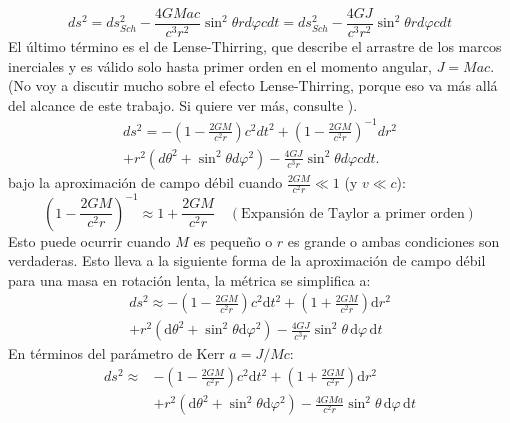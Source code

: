 $$
    d s^2=d s_{S c h}^2-\frac{4 G M a c}{c^3 r^2} \sin ^2 \theta r d \varphi c d t=d s_{S c h}^2-\frac{4 G J}{c^3 r^2} \sin ^2 \theta r d \varphi c d t
$$
El último término es el de Lense-Thirring, que describe el arrastre de los marcos inerciales y es válido solo hasta primer orden en el momento angular, $J = Mac$. (No voy a discutir mucho sobre el efecto Lense-Thirring, porque eso va más allá del alcance de este trabajo. Si quiere ver más, consulte ).
\begin{multline}
    d s^2 = - \left(1-\frac{2 G M}{c^2 r}\right) c^2 d t^2
    + \left(1-\frac{2 G M}{c^2 r}\right)^{-1} d r^2 \\
    + r^2\left(d \theta^2+\sin^2 \theta d \varphi^2\right)
    - \frac{4 G J}{c^3 r} \sin^2 \theta d \varphi c d t.
\end{multline}
bajo la aproximación de campo débil cuando $\frac{2GM}{c^2r} \ll 1$ (y $v \ll c$):
\begin{equation}
    \left(1-\frac{2GM}{c^2r}\right)^{-1} \approx 1 + \frac{2GM}{c^2r} \quad (\text{Expansión de Taylor a primer orden})
\end{equation}
Esto puede ocurrir cuando $M$ es pequeño o $r$ es grande o ambas condiciones son verdaderas.
Esto lleva a la siguiente forma de la aproximación de campo débil para una masa en rotación lenta, la métrica se simplifica a:
\begin{multline}
    ds^2 \approx -\left(1-\frac{2GM}{c^2r}\right)c^2\mathrm{d}t^2
    + \left(1+\frac{2GM}{c^2r}\right)\mathrm{d}r^2 \\
    + r^2\left(\mathrm{d}\theta^2 + \sin^2\theta\mathrm{d}\varphi^2\right)
    - \frac{4GJ}{c^3r}\sin^2\theta\, \mathrm{d}\varphi\, \mathrm{d}t
\end{multline}
En términos del parámetro de Kerr $a = J/Mc$:
\begin{align}
    ds^2 \approx & -\left(1-\frac{2GM}{c^2r}\right)c^2\mathrm{d}t^2
    + \left(1+\frac{2GM}{c^2r}\right)\mathrm{d}r^2 \nonumber                              \\
                 & + r^2\left(\mathrm{d}\theta^2 + \sin^2\theta\mathrm{d}\varphi^2\right)
    - \frac{4GMa}{c^2r}\sin^2\theta\, \mathrm{d}\varphi\, \mathrm{d}t
\end{align}

